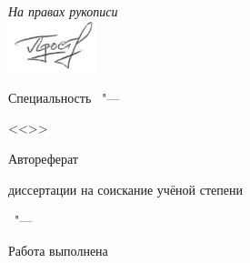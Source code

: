\thispagestyle{empty}

\vspace{0pt plus1fill} %
\begin{flushright}
  \large{\textit{На правах рукописи}}\\
  \includegraphics[height=1.5cm]{signatures/personal} 
\end{flushright}

\vspace{0pt plus3fill} %
\begin{center}
\textbf {\large \ThesisAuthor}
\end{center}

\vspace{0pt plus3fill} %
\begin{center}
\textbf {\Large \ThesisTitle}

\vspace{0pt plus3fill} %
{\large Специальность \ThesisSpecialtyNumber\ "---\par <<\ThesisSpecialtyTitle>>}

\vspace{0pt plus1.5fill} %
\Large{Автореферат}\par
\large{диссертации на соискание учёной степени\par \ThesisDegree}
\end{center}

\vspace{0pt plus4fill} %
\begin{center}
{\large{\ThesisCity\ "--- \ThesisYear}}
\end{center}

\newpage
\thispagestyle{empty}
\noindent Работа выполнена \ThesisWorkspace


